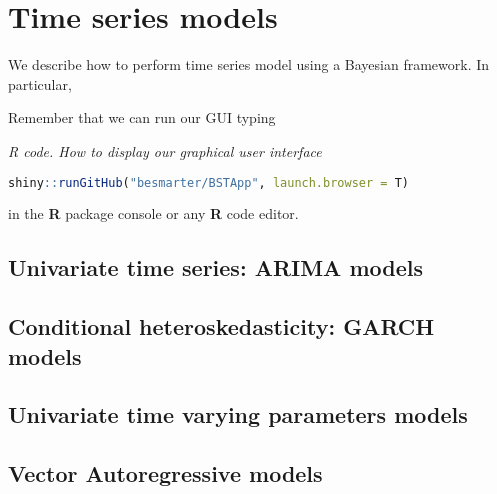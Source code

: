 \chapter{Time series models}\label{chap8}
We describe how to perform time series model using a Bayesian framework. In particular,

Remember that we can run our GUI typing

\begin{tcolorbox}[enhanced,width=4.67in,center upper,
	fontupper=\large\bfseries,drop shadow southwest,sharp corners]
	\textit{R code. How to display our graphical user interface}
	\begin{VF}
		\begin{lstlisting}[language=R]
		shiny::runGitHub("besmarter/BSTApp", launch.browser = T)\end{lstlisting}
	\end{VF}
\end{tcolorbox} 

in the \textbf{R} package console or any \textbf{R} code editor.

\section{Univariate time series: ARIMA models}\label{sec81}

\section{Conditional heteroskedasticity: GARCH models}\label{sec82}

\section{Univariate time varying parameters models}\label{sec83}

\section{Vector Autoregressive models}\label{sec84}
